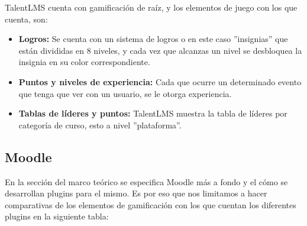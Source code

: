 \begin{multicols}{2}
    \noindent TalentLMS cuenta con gamificación de raíz, y los elementos de juego con los que cuenta, son:
    \begin{itemize} 
        \item \textbf{Logros: } Se cuenta con un sistema de logros o en este caso ''insignias'' que están divididas en 8 niveles, y cada vez que alcanzas un nivel se desbloquea la insignia en su color correspondiente.
        \item \textbf{Puntos y niveles de experiencia: } Cada que ocurre un determinado evento que tenga que ver con un usuario, se le otorga experiencia.
        \item \textbf{Tablas de líderes y puntos: } TalentLMS muestra la tabla de líderes por categoría de curso, esto a nivel ''plataforma''.
    \end{itemize}
\end{multicols}

\clearpage
\subsection{Moodle}
   
   En la sección del marco teórico se especifica Moodle más a fondo y el cómo se desarrollan plugins para el mismo. Es por eso que nos limitamos a hacer comparativas de los elementos de gamificación con los que cuentan los diferentes plugins en la siguiente tabla:

   

 
